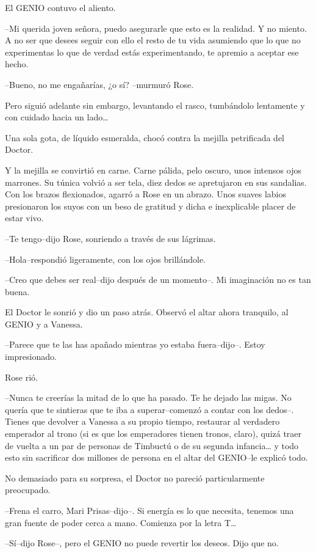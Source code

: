 El GENIO contuvo el aliento.

--Mi querida joven señora, puedo asegurarle que esto es la realidad. Y
no miento. A no ser que desees seguir con ello el resto de tu vida
asumiendo que lo que no experimentas lo que de verdad estás
experimentando, te apremio a aceptar ese hecho.

--Bueno, no me engañarías, ¿o sí? --murmuró Rose.

Pero siguió adelante sin embargo, levantando el rasco, tumbándolo
lentamente y con cuidado hacia un lado\ldots{}

Una sola gota, de líquido esmeralda, chocó contra la mejilla petrificada
del Doctor.

Y la mejilla se convirtió en carne. Carne pálida, pelo oscuro, unos
intensos ojos marrones. Su túnica volvió a ser tela, diez dedos se
apretujaron en sus sandalias. Con los brazos flexionados, agarró a Rose
en un abrazo. Unos suaves labios presionaron los suyos con un beso de
gratitud y dicha e inexplicable placer de estar vivo.

--Te tengo--dijo Rose, sonriendo a través de sus lágrimas.

--Hola--respondió ligeramente, con los ojos brillándole.

--Creo que debes ser real--dijo después de un momento--. Mi imaginación
no es tan buena.

El Doctor le sonrió y dio un paso atrás. Observó el altar ahora
tranquilo, al GENIO y a Vanessa.

--Parece que te las has apañado mientras yo estaba fuera--dijo--. Estoy
impresionado.

Rose rió.

--Nunca te creerías la mitad de lo que ha pasado. Te he dejado las
migas. No quería que te sintieras que te iba a superar--comenzó a contar
con los dedos--. Tienes que devolver a Vanessa a su propio tiempo,
restaurar al verdadero emperador al trono (si es que los emperadores
tienen tronos, claro), quizá traer de vuelta a un par de personas de
Timbuctú o de su segunda infancia\ldots{} y todo esto sin sacrificar dos
millones de persona en el altar del GENIO--le explicó todo.

No demasiado para su sorpresa, el Doctor no pareció particularmente
preocupado.

--Frena el carro, Mari Prisas--dijo--. Si energía es lo que necesita,
tenemos una gran fuente de poder cerca a mano. Comienza por la letra
T\ldots{}

--Sí--dijo Rose--, pero el GENIO no puede revertir los deseos. Dijo que
no.

